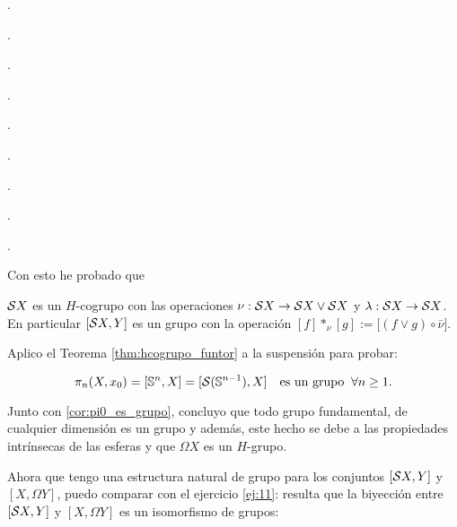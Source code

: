 \documentclass[../../topologia_algebraica]{subfiles}
\begin{document}
.

.

.

.

.

.

.

.

.

Con esto he probado que

\begin{prop}
  $\mathcal{S} X$ es un $H$-cogrupo con las operaciones $\nu:\mathcal{S} X\rightarrow\mathcal{S} X\vee\mathcal{S} X$ y
  $\lambda:\mathcal{S} X\rightarrow\mathcal{S} X$. En particular $[\mathcal{S} X,Y]$ es un grupo con la operaci\'on
  $[f]*_{\nu}[g]:=\big[(f\vee g)\circ\bar{\nu}\big]$.  
\end{prop}

Aplico el Teorema \ref{thm:hcogrupo_funtor} a la suspensi\'on para probar:
\begin{prop}
  \[
    \pi_n(X,x_0)=[\mathbb{S}^n,X]=[\mathcal{S}(\mathbb{S}^{n-1}),X] \quad\text{es un grupo}\;\;\forall n\geq 1.
  \]
\end{prop}

Junto con \ref{cor:pi0_es_grupo}, concluyo que todo grupo fundamental, de cualquier dimensi\'on
es un grupo y adem\'as, este hecho se debe a las propiedades intr\'insecas de las esferas
y que $\Omega X$ es un $H$-grupo.

Ahora que tengo una estructura natural de grupo para los conjuntos $[\mathcal{S} X,Y]$ y $[X,\Omega Y]$,
puedo comparar con el ejercicio \ref{ej:11}: resulta que la biyecci\'on entre $[\mathcal{S} X,Y]$ y
$[X,\Omega Y]$ es un isomorfismo de grupos:
\end{document}
